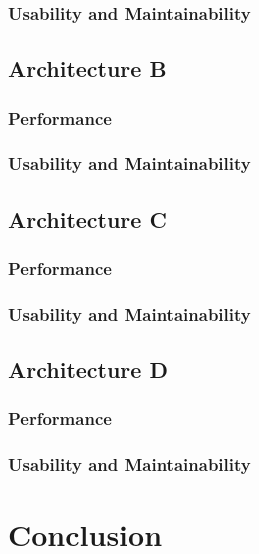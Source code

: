 \documentclass{article}
\begin{document}
\subsubsection{Usability and Maintainability}

\subsection{Architecture B}
\subsubsection{Performance}

\subsubsection{Usability and Maintainability}

\subsection{Architecture C}
\subsubsection{Performance}

\subsubsection{Usability and Maintainability}

\subsection{Architecture D}
\subsubsection{Performance}

\subsubsection{Usability and Maintainability}

\section{Conclusion}
\end{document}
